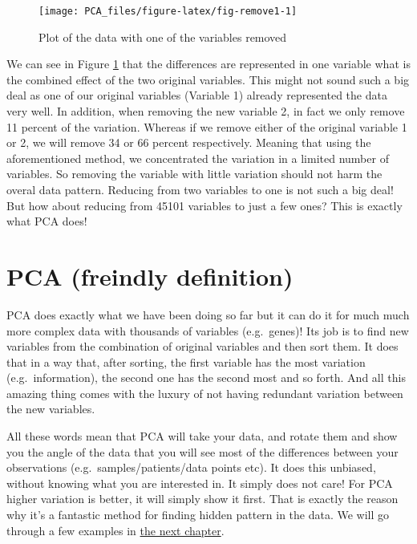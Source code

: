 \documentclass[
]{book}
\theoremstyle{definition}
\theoremstyle{definition}
\theoremstyle{definition}
\theoremstyle{remark}
\begin{document}
\begin{figure}

{\centering \texttt{[image: PCA\_files/figure-latex/fig-remove1-1]} 

}

\caption{Plot of the data with one of the variables removed}\label{fig:fig-remove1}
\end{figure}

We can see in Figure \ref{fig:fig-remove1} that the differences are represented in one variable what is the combined effect of the two original variables. This might not sound such a big deal as one of our original variables (Variable 1) already represented the data very well. In addition, when removing the new variable 2, in fact we only remove 11 percent of the variation. Whereas if we remove either of the original variable 1 or 2, we will remove 34 or 66 percent respectively. Meaning that using the aforementioned method, we concentrated the variation in a limited number of variables. So removing the variable with little variation should not harm the overal data pattern. Reducing from two variables to one is not such a big deal! But how about reducing from 45101 variables to just a few ones? This is exactly what PCA does!

\hypertarget{pcafri}{%
\section{PCA (freindly definition)}\label{pcafri}}

PCA does exactly what we have been doing so far but it can do it for much much more complex data with thousands of variables (e.g.~genes)! Its job is to find new variables from the combination of original variables and then sort them. It does that in a way that, after sorting, the first variable has the most variation (e.g.~information), the second one has the second most and so forth. And all this amazing thing comes with the luxury of not having redundant variation between the new variables.

All these words mean that PCA will take your data, and rotate them and show you the angle of the data that you will see most of the differences between your observations (e.g.~samples/patients/data points etc). It does this unbiased, without knowing what you are interested in. It simply does not care! For PCA higher variation is better, it will simply show it first. That is exactly the reason why it's a fantastic method for finding hidden pattern in the data. We will go through a few examples in \protect\hyperlink{pcaapplications}{the next chapter}.
\end{document}
